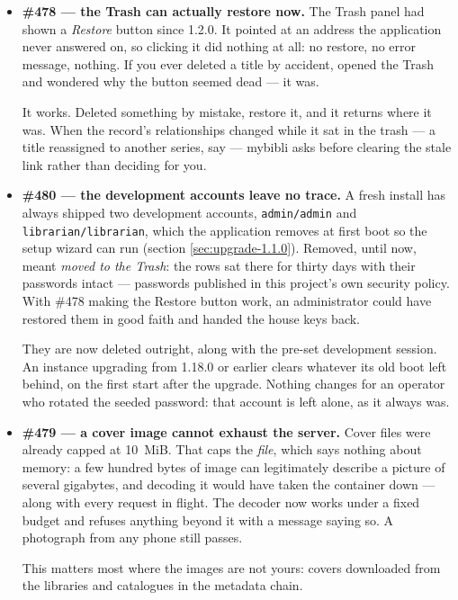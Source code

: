 \begin{itemize}
  \item \textbf{\#478 \string— the Trash can actually restore now.}
        The Trash panel had shown a \emph{Restore} button since 1.2.0.
        It pointed at an address the application never answered on, so
        clicking it did nothing at all: no restore, no error message,
        nothing. If you ever deleted a title by accident, opened the
        Trash and wondered why the button seemed dead --- it was.

        It works. Deleted something by mistake, restore it, and it
        returns where it was. When the record's relationships changed
        while it sat in the trash --- a title reassigned to another
        series, say --- mybibli asks before clearing the stale link
        rather than deciding for you.

  \item \textbf{\#480 \string— the development accounts leave no
        trace.} A fresh install has always shipped two development
        accounts, \texttt{admin/admin} and
        \texttt{librarian/librarian}, which the application removes at
        first boot so the setup wizard can run (section
        \ref{sec:upgrade-1.1.0}). Removed, until now, meant
        \emph{moved to the Trash}: the rows sat there for thirty days
        with their passwords intact --- passwords published in this
        project's own security policy. With \#478 making the Restore
        button work, an administrator could have restored them in good
        faith and handed the house keys back.

        They are now deleted outright, along with the pre-set
        development session. An instance upgrading from 1.18.0 or
        earlier clears whatever its old boot left behind, on the first
        start after the upgrade. Nothing changes for an operator who
        rotated the seeded password: that account is left alone, as it
        always was.

  \item \textbf{\#479 \string— a cover image cannot exhaust the
        server.} Cover files were already capped at 10~MiB. That caps
        the \emph{file}, which says nothing about memory: a few hundred
        bytes of image can legitimately describe a picture of several
        gigabytes, and decoding it would have taken the container down
        --- along with every request in flight. The decoder now works
        under a fixed budget and refuses anything beyond it with a
        message saying so. A photograph from any phone still passes.

        This matters most where the images are not yours: covers
        downloaded from the libraries and catalogues in the metadata
        chain.
\end{itemize}


